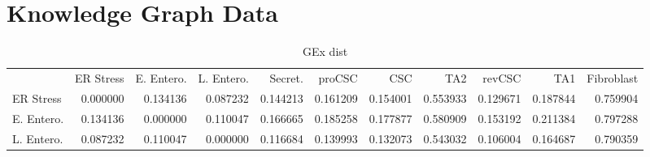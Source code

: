 \newpage
\newpage
\newpage
\section{Knowledge Graph Data}

\label{tab:wavpy}


\begin{table}
    \centering
    \caption{GEx dist}
    \label{tab:kgdistge}
    \begin{tabular}{lrrrrrrrrrr}
        {} & {ER Stress} & {E. Entero.} & {L. Entero.} & {Secret.} & {proCSC} & {CSC} & {TA2} & {revCSC} & {TA1} & {Fibroblast} \\
        ER Stress & {\cellcolor[HTML]{000004}} \color[HTML]{F1F1F1} 0.000000 & {\cellcolor[HTML]{240C4F}} \color[HTML]{F1F1F1} 0.134136 & {\cellcolor[HTML]{120A32}} \color[HTML]{F1F1F1} 0.087232 & {\cellcolor[HTML]{280B53}} \color[HTML]{F1F1F1} 0.144213 & {\cellcolor[HTML]{310A5C}} \color[HTML]{F1F1F1} 0.161209 & {\cellcolor[HTML]{2D0B59}} \color[HTML]{F1F1F1} 0.154001 & {\cellcolor[HTML]{CE4347}} \color[HTML]{F1F1F1} 0.553933 & {\cellcolor[HTML]{230C4C}} \color[HTML]{F1F1F1} 0.129671 & {\cellcolor[HTML]{3D0965}} \color[HTML]{F1F1F1} 0.187844 & {\cellcolor[HTML]{FA9207}} \color[HTML]{000000} 0.759904 \\
        E. Entero. & {\cellcolor[HTML]{240C4F}} \color[HTML]{F1F1F1} 0.134136 & {\cellcolor[HTML]{000004}} \color[HTML]{F1F1F1} 0.000000 & {\cellcolor[HTML]{1B0C41}} \color[HTML]{F1F1F1} 0.110047 & {\cellcolor[HTML]{320A5E}} \color[HTML]{F1F1F1} 0.166665 & {\cellcolor[HTML]{3B0964}} \color[HTML]{F1F1F1} 0.185258 & {\cellcolor[HTML]{380962}} \color[HTML]{F1F1F1} 0.177877 & {\cellcolor[HTML]{D74B3F}} \color[HTML]{F1F1F1} 0.580909 & {\cellcolor[HTML]{2D0B59}} \color[HTML]{F1F1F1} 0.153192 & {\cellcolor[HTML]{470B6A}} \color[HTML]{F1F1F1} 0.211384 & {\cellcolor[HTML]{FCA50A}} \color[HTML]{000000} 0.797288 \\
        L. Entero. & {\cellcolor[HTML]{120A32}} \color[HTML]{F1F1F1} 0.087232 & {\cellcolor[HTML]{1B0C41}} \color[HTML]{F1F1F1} 0.110047 & {\cellcolor[HTML]{000004}} \color[HTML]{F1F1F1} 0.000000 & {\cellcolor[HTML]{1C0C43}} \color[HTML]{F1F1F1} 0.116684 & {\cellcolor[HTML]{260C51}} \color[HTML]{F1F1F1} 0.139993 & {\cellcolor[HTML]{230C4C}} \color[HTML]{F1F1F1} 0.132073 & {\cellcolor[HTML]{CB4149}} \color[HTML]{F1F1F1} 0.543032 & {\cellcolor[HTML]{190C3E}} \color[HTML]{F1F1F1} 0.106004 & {\cellcolor[HTML]{320A5E}} \color[HTML]{F1F1F1} 0.164687 & {\cellcolor[HTML]{FCA108}} \color[HTML]{000000} 0.790359 \\

\end{tabular}
\end{table}
